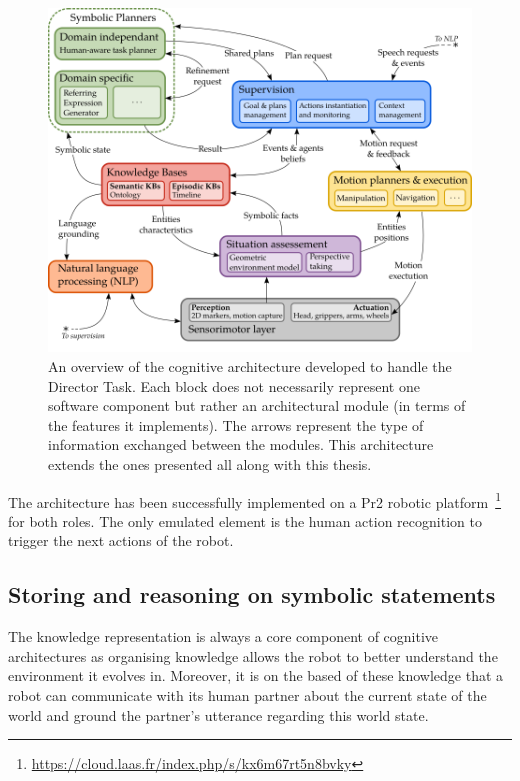 \begin{figure}[ht!]
\centering
\includegraphics[width=\textwidth]{figures/chapter9/architecture.png}
\caption{\label{fig:chap9_architecture} An overview of the cognitive architecture developed to handle the Director Task. Each block does not necessarily represent one software component but rather an architectural module (in terms of the features it implements). The arrows represent the type of information exchanged between the modules. This architecture extends the ones presented all along with this thesis.}
\end{figure}

The architecture has been successfully implemented on a Pr2 robotic platform~\footnote{\url{https://cloud.laas.fr/index.php/s/kx6m67rt5n8bvky}} for both roles. The only emulated element is the human action recognition to trigger the next actions of the robot.

\subsection{Storing and reasoning on symbolic statements}

The knowledge representation is always a core component of cognitive architectures as organising knowledge allows the robot to better understand the environment it evolves in. Moreover, it is on the based of these knowledge that a robot can communicate with its human partner about the current state of the world and ground the partner's utterance regarding this world state.

